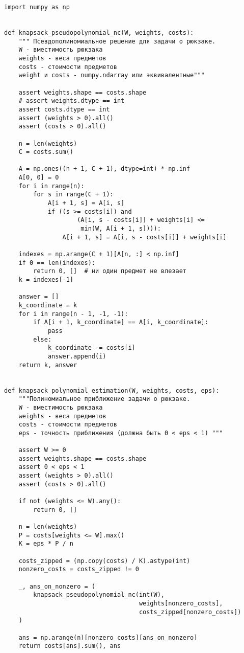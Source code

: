 \documentclass{article}
\begin{document}
\begin{verbatim}
import numpy as np


def knapsack_pseudopolynomial_nc(W, weights, costs):
    """ Псевдополиномиальное решение для задачи о рюкзаке.
    W - вместимость рюкзака
    weights - веса предметов
    costs - стоимости предметов
    weight и costs - numpy.ndarray или эквивалентные"""

    assert weights.shape == costs.shape
    # assert weights.dtype == int
    assert costs.dtype == int
    assert (weights > 0).all()
    assert (costs > 0).all()

    n = len(weights)
    C = costs.sum()

    A = np.ones((n + 1, C + 1), dtype=int) * np.inf
    A[0, 0] = 0
    for i in range(n):
        for s in range(C + 1):
            A[i + 1, s] = A[i, s]
            if ((s >= costs[i]) and
                    (A[i, s - costs[i]] + weights[i] <=
                     min(W, A[i + 1, s]))):
                A[i + 1, s] = A[i, s - costs[i]] + weights[i]

    indexes = np.arange(C + 1)[A[n, :] < np.inf]
    if 0 == len(indexes):
        return 0, []  # ни один предмет не влезает
    k = indexes[-1]

    answer = []
    k_coordinate = k
    for i in range(n - 1, -1, -1):
        if A[i + 1, k_coordinate] == A[i, k_coordinate]:
            pass
        else:
            k_coordinate -= costs[i]
            answer.append(i)
    return k, answer


def knapsack_polynomial_estimation(W, weights, costs, eps):
    """Полиномиальное приближение задачи о рюкзаке.
    W - вместимость рюкзака
    weights - веса предметов
    costs - стоимости предметов
    eps - точность приближения (должна быть 0 < eps < 1) """

    assert W >= 0
    assert weights.shape == costs.shape
    assert 0 < eps < 1
    assert (weights > 0).all()
    assert (costs > 0).all()

    if not (weights <= W).any():
        return 0, []

    n = len(weights)
    P = costs[weights <= W].max()
    K = eps * P / n

    costs_zipped = (np.copy(costs) / K).astype(int)
    nonzero_costs = costs_zipped != 0

    _, ans_on_nonzero = (
        knapsack_pseudopolynomial_nc(int(W),
                                     weights[nonzero_costs],
                                     costs_zipped[nonzero_costs])
    )

    ans = np.arange(n)[nonzero_costs][ans_on_nonzero]
    return costs[ans].sum(), ans



\end{verbatim}
\end{document}
